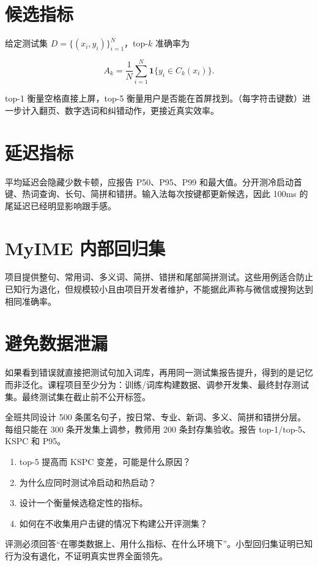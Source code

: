 \section{候选指标}

给定测试集 \(D=\{(x_i,y_i)\}_{i=1}^N\)，top-\(k\) 准确率为

\[
A_k=\frac{1}{N}\sum_{i=1}^{N}\mathbf{1}\{y_i\in C_k(x_i)\}.
\]

top-1 衡量空格直接上屏，top-5 衡量用户是否能在首屏找到。（每字符击键数）进一步计入翻页、数字选词和纠错动作，更接近真实效率。

\section{延迟指标}

平均延迟会隐藏少数卡顿，应报告 P50、P95、P99 和最大值。分开测冷启动首键、热词查询、长句、简拼和错拼。输入法每次按键都更新候选，因此 100ms 的尾延迟已经明显影响跟手感。

\section{MyIME 内部回归集}

项目提供整句、常用词、多义词、简拼、错拼和尾部简拼测试。这些用例适合防止已知行为退化，但规模较小且由项目开发者维护，不能据此声称与微信或搜狗达到相同准确率。



\section{避免数据泄漏}

如果看到错误就直接把测试句加入词库，再用同一测试集报告提升，得到的是记忆而非泛化。课程项目至少分为：训练/词库构建数据、调参开发集、最终封存测试集。最终测试集在截止前不公开标签。

\begin{lab}[建立班级基准]
全班共同设计 500 条匿名句子，按日常、专业、新词、多义、简拼和错拼分层。每组只能在 300 条开发集上调参，教师用 200 条封存集验收。报告 top-1/top-5、KSPC 和 P95。
\end{lab}

\exercises
\begin{enumerate}
  \item top-5 提高而 KSPC 变差，可能是什么原因？
  \item 为什么应同时测试冷启动和热启动？
  \item 设计一个衡量候选稳定性的指标。
  \item 如何在不收集用户击键的情况下构建公开评测集？
\end{enumerate}

\begin{summarybox}
评测必须回答“在哪类数据上、用什么指标、在什么环境下”。小型回归集证明已知行为没有退化，不证明真实世界全面领先。
\end{summarybox}
